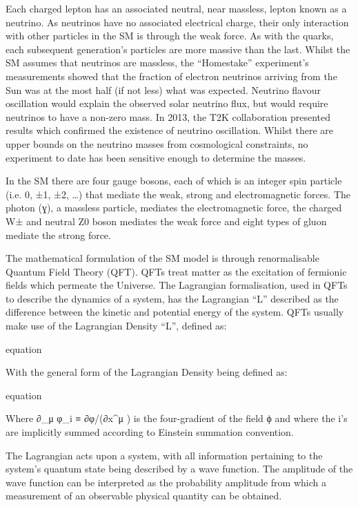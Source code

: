 Each charged lepton has an associated neutral, near massless, lepton known as a neutrino. 
As neutrinos have no associated electrical charge, their only interaction with other particles in the SM is through the weak force. 
As with the quarks, each subsequent generation’s particles are more massive than the last. 
Whilst the SM assumes that neutrinos are massless, the “Homestake” experiment’s measurements showed that the fraction of electron neutrinos arriving from the Sun was at the most half (if not less) what was expected. 
Neutrino flavour oscillation would explain the observed solar neutrino flux, but would require neutrinos to have a non-zero mass. 
In 2013, the T2K collaboration presented results which confirmed the existence of neutrino oscillation. 
Whilst there are upper bounds on the neutrino masses from cosmological constraints, no experiment to date has been sensitive enough to determine the masses. 

In the SM there are four gauge bosons, each of which is an integer spin particle (i.e. 0, ±1, ±2, …) that mediate the weak, strong and electromagnetic forces. 
The photon (ɣ), a massless particle, mediates the electromagnetic force, the charged W± and neutral Z0 boson mediates the weak force and eight types of gluon mediate the strong force. 

The mathematical formulation of the SM model is through renormalisable Quantum Field Theory (QFT). 
QFTs treat matter as the excitation of fermionic fields which permeate the Universe. 
The Lagrangian formalisation, used in QFTs to describe the dynamics of a system, has the Lagrangian “L” described as the difference between the kinetic and potential energy of the system. 
QFTs usually make use of the Lagrangian Density “L”, defined as:

equation

With the general form of the Lagrangian Density being defined as:

equation

Where ∂_μ φ_i  ≡  ∂φ/(∂x^μ ) is the four-gradient of the field ϕ and where the i’s are implicitly summed according to Einstein summation convention.

The Lagrangian acts upon a system, with all information pertaining to the system’s quantum state being described by a wave function. 
The amplitude of the wave function can be interpreted as the probability amplitude from which a measurement of an observable physical quantity can be obtained. 


